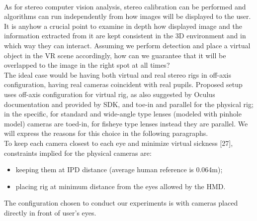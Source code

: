 \\
As for stereo computer vision analysis, stereo calibration can be performed and algorithms can run independently from how images will be displayed to the user. It is anyhow a crucial point to examine in depth how displayed image and the information extracted from it are kept consistent in the 3D environment and in which way they can interact. Assuming we perform detection and place a virtual object in the VR scene accordingly, how can we guarantee that it will be overlapped to the image in the right spot at all times?\\
The ideal case would be having both virtual and real stereo rigs in off-axis configuration, having real cameras coincident with real pupils. Proposed setup uses off-axis configuration for virtual rig, as also suggested by Oculus documentation and provided by SDK, and toe-in and parallel for the physical rig; in the specific, for standard and wide-angle type lenses (modeled with pinhole model) cameras are toed-in, for fisheye type lenses instead they are parallel. We will express the reasons for this choice in the following paragraphs.\\
To keep each camera closest to each eye and minimize virtual sickness [27], constraints implied for the physical cameras are:
\begin{itemize}
\item keeping them at IPD distance (average human reference is 0.064m);
\item placing rig at minimum distance from the eyes allowed by the HMD.
\end{itemize}
The configuration chosen to conduct our experiments is with cameras placed directly in front of user’s eyes.


